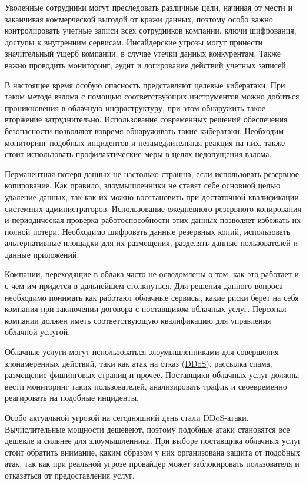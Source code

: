 Уволенные сотрудники могут преследовать различные цели, начиная от мести и заканчивая коммерческой выгодой от кражи данных, поэтому особо важно контролировать учетные записи всех сотрудников компании, ключи шифрования, доступы к внутренним сервисам.
Инсайдерские угрозы могут принести значительный ущерб компании, в случае утечки данных конкурентам.
Также важно проводить мониторинг, аудит и логирование действий учетных записей.

В настоящее время особую опасность представляют целевые кибератаки.
При таком методе взлома с помощью соответствующих инструментов можно добиться проникновения в облачную инфраструктуру, при этом обнаружить такое вторжение затруднительно.
Использование современных решений обеспечения безопасности позволяют вовремя обнаруживать такие кибератаки.
Необходим мониторинг подобных инцидентов и незамедлительная реакция на них, также стоит использовать профилактические меры в целях недопущения взлома.

Перманентная потеря данных не настолько страшна, если использовать резервное копирование.
Как правило, злоумышленники не ставят себе основной целью удаление данных, так как их можно восстановить при достаточной квалификации системных администраторов.
Использование ежедневного резервного копирования и периодическая проверка работоспособности этих данных позволяет избежать их полной потери.
Необходимо шифровать данные резервных копий, использовать альтернативные площадки для их размещения, разделять данные пользователей и данные приложений.

Компании, переходящие в облака часто не осведомлены о том, как это работает и с чем им придется в дальнейшем столкнуться.
Для решения данного вопроса необходимо понимать как работают облачные сервисы, какие риски берет на себя компания при заключении договора с поставщиком облачных услуг.
Персонал компании должен иметь соответствующую квалификацию для управления облачной услугой.

Облачные услуги могут использоваться злоумышленниками для совершения злонамеренных действий, таки как атак на отказ (\hyperlink{ddos}{DDoS}), рассылка спама, размещение фишинговых страниц и прочее.
Поставщики облачных услуг должны вести мониторинг таких пользователей, анализировать трафик и своевременно реагировать на подобные инциденты.

Особо актуальной угрозой на сегодняшний день стали DDoS-атаки.
Вычислительные мощности дешевеют, поэтому подобные атаки становятся все дешевле и сильнее для злоумышленника.
При выборе поставщика облачных услуг стоит обратить внимание, каким образом у них организована защита от подобных атак, так как при реальной угрозе провайдер может заблокировать пользователя и отказаться от предоставления услуг.

